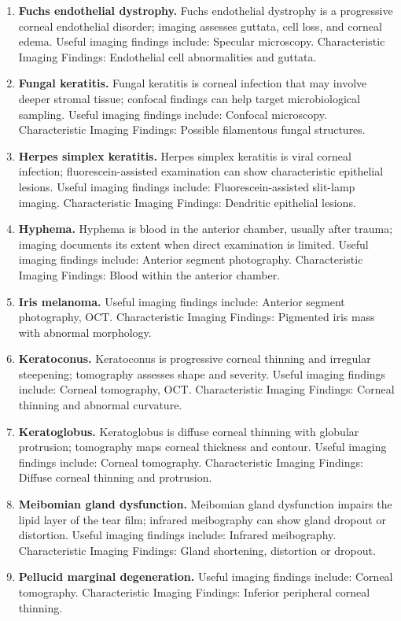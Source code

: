 \begin{enumerate}[leftmargin=*,itemsep=0.45em,topsep=0.4em]
\item \textbf{Fuchs endothelial dystrophy.} Fuchs endothelial dystrophy is a progressive corneal endothelial disorder; imaging assesses guttata, cell loss, and corneal edema. Useful imaging findings include: Specular microscopy. Characteristic Imaging Findings: Endothelial cell abnormalities and guttata.
\item \textbf{Fungal keratitis.} Fungal keratitis is corneal infection that may involve deeper stromal tissue; confocal findings can help target microbiological sampling. Useful imaging findings include: Confocal microscopy. Characteristic Imaging Findings: Possible filamentous fungal structures.
\item \textbf{Herpes simplex keratitis.} Herpes simplex keratitis is viral corneal infection; fluorescein-assisted examination can show characteristic epithelial lesions. Useful imaging findings include: Fluorescein-assisted slit-lamp imaging. Characteristic Imaging Findings: Dendritic epithelial lesions.
\item \textbf{Hyphema.} Hyphema is blood in the anterior chamber, usually after trauma; imaging documents its extent when direct examination is limited. Useful imaging findings include: Anterior segment photography. Characteristic Imaging Findings: Blood within the anterior chamber.
\item \textbf{Iris melanoma.} Useful imaging findings include: Anterior segment photography, OCT. Characteristic Imaging Findings: Pigmented iris mass with abnormal morphology.
\item \textbf{Keratoconus.} Keratoconus is progressive corneal thinning and irregular steepening; tomography assesses shape and severity. Useful imaging findings include: Corneal tomography, OCT. Characteristic Imaging Findings: Corneal thinning and abnormal curvature.
\item \textbf{Keratoglobus.} Keratoglobus is diffuse corneal thinning with globular protrusion; tomography maps corneal thickness and contour. Useful imaging findings include: Corneal tomography. Characteristic Imaging Findings: Diffuse corneal thinning and protrusion.
\item \textbf{Meibomian gland dysfunction.} Meibomian gland dysfunction impairs the lipid layer of the tear film; infrared meibography can show gland dropout or distortion. Useful imaging findings include: Infrared meibography. Characteristic Imaging Findings: Gland shortening, distortion or dropout.
\item \textbf{Pellucid marginal degeneration.} Useful imaging findings include: Corneal tomography. Characteristic Imaging Findings: Inferior peripheral corneal thinning.

\end{enumerate}
